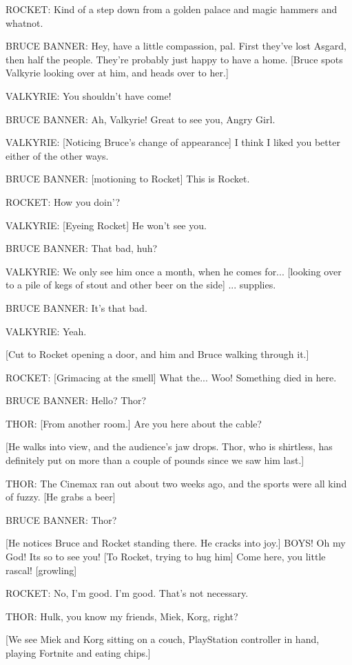 ROCKET: Kind of a step down from a golden palace and magic hammers and whatnot.

BRUCE BANNER: Hey, have a little compassion, pal. First they've lost Asgard, then half the people. They're probably just happy to have a home. [Bruce spots Valkyrie looking over at him, and heads over to her.]

VALKYRIE: You shouldn't have come!

BRUCE BANNER: Ah, Valkyrie! Great to see you, Angry Girl.

VALKYRIE: [Noticing Bruce's change of appearance] I think I liked you better either of the other ways.

BRUCE BANNER: [motioning to Rocket] This is Rocket.

ROCKET: How you doin'?

VALKYRIE: [Eyeing Rocket] He won't see you.

BRUCE BANNER: That bad, huh?

VALKYRIE: We only see him once a month, when he comes for... [looking over to a pile of kegs of stout and other beer on the side] ... supplies.

BRUCE BANNER: It's that bad.

VALKYRIE: Yeah.

[Cut to Rocket opening a door, and him and Bruce walking through it.]

ROCKET: [Grimacing at the smell] What the... Woo! Something died in here.

BRUCE BANNER: Hello? Thor?

THOR: [From another room.] Are you here about the cable?

[He walks into view, and the audience's jaw drops. Thor, who is shirtless, has definitely put on more than a couple of pounds since we saw him last.]

THOR: The Cinemax ran out about two weeks ago, and the sports were all kind of fuzzy. [He grabs a beer]

BRUCE BANNER: Thor?

[He notices Bruce and Rocket standing there. He cracks into joy.] BOYS! Oh my God! Its so to see you! [To Rocket, trying to hug him] Come here, you little rascal! [growling]

ROCKET: No, I'm good. I'm good. That's not necessary.

THOR: Hulk, you know my friends, Miek, Korg, right?

[We see Miek and Korg sitting on a couch, PlayStation controller in hand, playing Fortnite and eating chips.]

